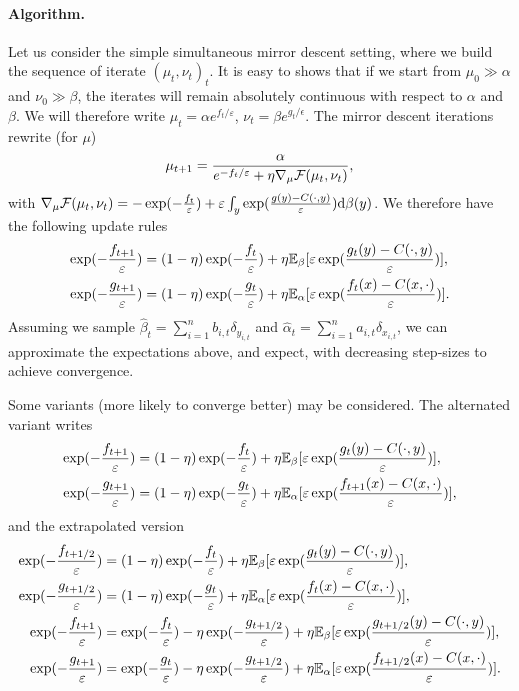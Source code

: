 \documentclass[a4paper, 10pt]{article}
\begin{document}
\paragraph{Algorithm.} Let us consider the simple simultaneous mirror descent setting, where we build
the sequence of iterate $(\mu_t, \nu_t)_t$. It is easy to shows that if we start
from $\mu_0 \gg \alpha$ and $\nu_0 \gg \beta$, the iterates will remain
absolutely continuous with respect to $\alpha$ and $\beta$. We will therefore
write $\mu_t = \alpha e^{f_t / \varepsilon}$, $\nu_t = \beta e^{g_t /
\epsilon}$. The mirror descent iterations rewrite (for $\mu$)
\begin{equation}
    \mu_{t+1} = \frac{\alpha}{e^{-f_t / \varepsilon} + \eta \nabla_\mu \mathcal{F}(\mu_t, \nu_t)},
\end{equation}
with $\nabla_\mu \mathcal{F}(\mu_t, \nu_t) = - \exp(-\frac{f_t}{\varepsilon})+ \varepsilon
\int_y \exp(\frac{g(y)-C(\cdot, y)}{\varepsilon})\textrm{d}\beta(y)$. We therefore have the
following update rules
\begin{align}
    \exp(-\frac{f_{t+1}}{\varepsilon}) &=
     (1 - \eta) \exp(-\frac{f_{t}}{\varepsilon}) 
     + \eta \mathbb{E}_\beta[\varepsilon \exp( \frac{g_t(y)-C(\cdot, y)}{\varepsilon})], \\
     \exp(-\frac{g_{t+1}}{\varepsilon}) &=
     (1 - \eta) \exp(-\frac{g_{t}}{\varepsilon}) 
     + \eta \mathbb{E}_\alpha[\varepsilon \exp( \frac{f_t(x)-C(x, \cdot)}{\varepsilon})].
\end{align}
Assuming we sample $\hat \beta_t = \sum_{i=1}^n b_{i,t} \delta_{y_{i,t}}$ and
$\hat \alpha_t = \sum_{i=1}^n a_{i,t} \delta_{x_{i,t}}$, we can approximate the
expectations above, and expect, with decreasing step-sizes to achieve
convergence.

Some variants (more likely to converge better) may be considered. The alternated variant writes
\begin{align}
    \exp(-\frac{f_{t+1}}{\varepsilon}) &=
     (1 - \eta) \exp(-\frac{f_{t}}{\varepsilon}) 
     + \eta \mathbb{E}_\beta[\varepsilon \exp( \frac{g_t(y)-C(\cdot, y)}{\varepsilon})], \\
     \exp(-\frac{g_{t+1}}{\varepsilon}) &=
     (1 - \eta) \exp(-\frac{g_{t}}{\varepsilon}) 
     + \eta \mathbb{E}_\alpha[\varepsilon \exp( \frac{f_{t+1}(x)-C(x, \cdot)}{\varepsilon})],
\end{align}
and the extrapolated version
\begin{align}
    \exp(-\frac{f_{t+1/2}}{\varepsilon}) &=
     (1 - \eta) \exp(-\frac{f_{t}}{\varepsilon}) 
     + \eta \mathbb{E}_\beta[\varepsilon \exp( \frac{g_t(y)-C(\cdot, y)}{\varepsilon})], \\
     \exp(-\frac{g_{t+1/2}}{\varepsilon}) &=
     (1 - \eta) \exp(-\frac{g_{t}}{\varepsilon}) 
     + \eta \mathbb{E}_\alpha[\varepsilon \exp( \frac{f_t(x)-C(x, \cdot)}{\varepsilon})], \\
     \exp(-\frac{f_{t+1}}{\varepsilon}) &=
     \exp(-\frac{f_{t}}{\varepsilon}) - \eta \exp(-\frac{g_{t + 1 / 2}}{\varepsilon})
     + \eta \mathbb{E}_\beta[\varepsilon \exp( \frac{g_{t+1/2}(y)-C(\cdot, y)}{\varepsilon})], \\
     \exp(-\frac{g_{t+1}}{\varepsilon}) &=
     \exp(-\frac{g_{t}}{\varepsilon}) - \eta \exp(-\frac{g_{t + 1 / 2}}{\varepsilon})
     + \eta \mathbb{E}_\alpha[\varepsilon \exp( \frac{f_{t+1/2}(x)-C(x, \cdot)}{\varepsilon})].
\end{align}
\end{document}
